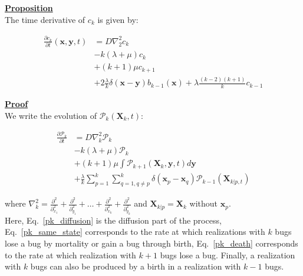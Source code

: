 \textbf{\underline{Proposition}}\\

The time derivative of $c_k$ is given by:

\begin{subequations} 
\begin{align}
\frac{\partial c_{k}}{\partial t}(\boldsymbol{x},\boldsymbol{y},t) & =D\nabla_{2}^{2}c_{k}\label{ck_diffusion-1}\\
 & -k(\lambda+\mu)c_{k}\label{ck_same_state-1}\\
 & +(k+1)\mu c_{k+1}\label{ck_death-1}\\
 & +2\frac{\lambda}{k}\delta(\boldsymbol{x}-\boldsymbol{y})b_{k-1}(\boldsymbol{x})+\lambda\frac{(k-2)(k+1)}{k}c_{k-1}\label{ck_birth-1}
\end{align}
\end{subequations}

\newpage

\textbf{\underline{Proof}}\\

We write the evolution of $\mathcal{P}_{k}(\boldsymbol{X}_{k},t)$:

\begin{subequations} 
\begin{align}
\frac{\partial\mathcal{P}_{k}}{\partial t} & =D\nabla_{k}^{2}\mathcal{P}_{k}\label{pk_diffusion}\\
 & -k(\lambda+\mu)\mathcal{P}_{k}\label{pk_same_state}\\
 & +(k+1)\mu\int\mathcal{P}_{k+1}(\boldsymbol{X}_{k},\boldsymbol{y},t)d\boldsymbol{y}\label{pk_death}\\
 & +\frac{\lambda}{k}\sum_{p=1}^{k}\sum_{q=1,q\neq p}^{k}\delta({\boldsymbol{x}_p-\boldsymbol{x}_q})\mathcal{P}_{k-1}(\boldsymbol{X}_{k|p,t})\label{pk_birth}
\end{align}
\end{subequations}

where $\nabla_{k}^{2}=\frac{\partial^{2}}{\partial_{x_{1}}^{2}}+\frac{\partial^{2}}{\partial_{y_{1}}^{2}}+\ldots+\frac{\partial^{2}}{\partial_{x_{k}}^{2}}+\frac{\partial^{2}}{\partial_{y_{k}}^{2}}$ and $\boldsymbol{X}_{k|p}=\boldsymbol{X}_{k}$
without $\boldsymbol{x}_{p}$. \\

Here, Eq.~\ref{pk_diffusion} is the diffusion part of the process, 
Eq.~\ref{pk_same_state} corresponds to the rate at which realizations with $k$ bugs lose a bug by mortality or gain a bug through birth,  Eq.~\ref{pk_death} corresponds to the rate at which realization with $k+1$ bugs lose a bug. Finally, a realization with $k$ bugs can also be produced by a birth in a realization with $k-1$ bugs. \\

